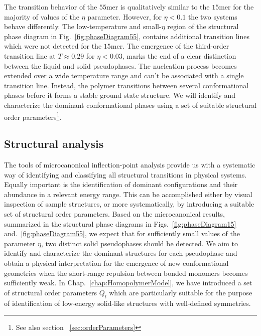 \documentclass[12pt]{report}
\begin{document}
The transition behavior of the $55$mer is qualitatively similar to the $15$mer for the majority of values of the $\eta$ parameter. However, for $\eta < 0.1$ the two systems behave differently. The low-temperature and small-$\eta$ region of the structural phase diagram in Fig.~\ref{fig:phaseDiagram55}, contains additional transition lines which were not detected for the $15$mer. The emergence of the third-order transition line at $T \approx 0.29$ for $\eta < 0.03$, marks the end of a clear distinction between the liquid and solid pseudophases. The nucleation process becomes extended over a wide temperature range and can't be associated with a single transition line. Instead, the polymer transitions between several conformational phases before it forms a stable ground state structure. We will identify and characterize the dominant conformational phases using a set of suitable structural order parameters\footnote{See also section ~\ref{sec:orderParameters}}.
 

\subsection{Structural analysis}
%
The tools of microcanonical inflection-point analysis provide us with a systematic way of identifying and classifying all structural transitions in physical systems. Equally important is the identification of dominant configurations and their abundance in a relevant energy range. This can be accomplished either by visual inspection of sample structures, or more systematically, by introducing a suitable set of structural order parameters. Based on the microcanonical results, summarized in the structural phase diagrams in Figs.~\ref{fig:phaseDiagram15} and.~\ref{fig:phaseDiagram55}, we expect that for sufficiently small values of the parameter $\eta$, two distinct solid pseudophases should be detected. We aim to identify and characterize the dominant structures for each pseudophase and obtain a physical interpretation for the emergence of new conformational geometries when the short-range repulsion between bonded monomers becomes sufficiently weak. In Chap.~\ref{chap:HomopolymerModel}, we have introduced a set of structural order parameters $Q_{l}$ which are particularly suitable for the purpose of identification of low-energy solid-like structures with well-defined symmetries.
%
\end{document}
